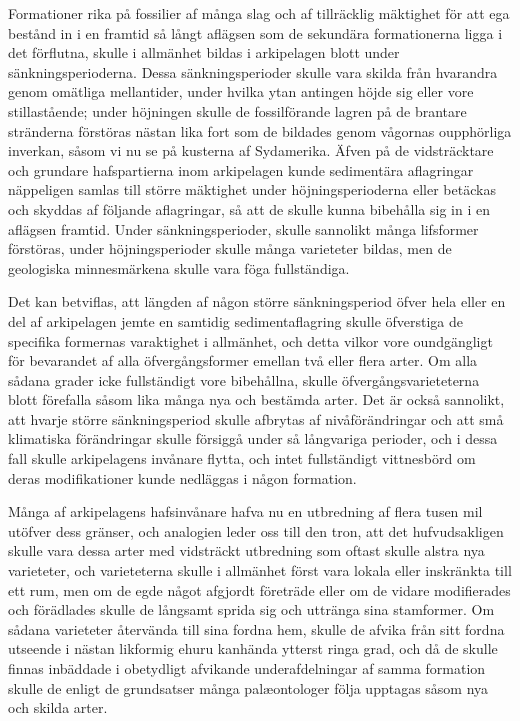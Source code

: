 Formationer rika på fossilier af många slag och af tillräcklig mäktighet för att ega bestånd in i en framtid så långt aflägsen som de sekundära formationerna ligga i det förflutna, skulle i allmänhet bildas i arkipelagen blott under sänkningsperioderna. Dessa sänkningsperioder skulle vara skilda från hvarandra genom omätliga mellantider, under hvilka ytan antingen höjde sig eller vore stillastående; under höjningen skulle de fossilförande lagren på de brantare stränderna förstöras nästan lika fort som de bildades genom vågornas oupphörliga inverkan, såsom vi nu se på kusterna af Sydamerika. Äfven på de vidsträcktare och grundare hafspartierna inom arkipelagen kunde sedimentära aflagringar näppeligen samlas till större mäktighet under höjningsperioderna eller betäckas och skyddas af följande aflagringar, så att de skulle kunna bibehålla sig in i en aflägsen framtid. Under sänkningsperioder, skulle sannolikt många lifsformer förstöras, under höjningsperioder skulle många varieteter bildas, men de geologiska minnesmärkena skulle vara föga fullständiga.

Det kan betviflas, att längden af någon större sänkningsperiod öfver hela eller en del af arkipelagen jemte en samtidig sedimentaflagring skulle öfverstiga de specifika formernas varaktighet i allmänhet, och detta vilkor vore oundgängligt för bevarandet af alla öfvergångsformer emellan två eller flera arter. Om alla sådana grader icke fullständigt vore bibehållna, skulle öfvergångsvarieteterna blott förefalla såsom lika många nya och bestämda arter. Det är också sannolikt, att hvarje större sänkningsperiod skulle afbrytas af nivåförändringar och att små klimatiska förändringar skulle försiggå under så långvariga perioder, och i dessa fall skulle arkipelagens invånare flytta, och intet fullständigt vittnesbörd om deras modifikationer kunde nedläggas i någon formation.

Många af arkipelagens hafsinvånare hafva nu en utbredning af flera tusen mil utöfver dess gränser, och analogien leder oss till den tron, att det hufvudsakligen skulle vara dessa arter med vidsträckt utbredning som oftast skulle alstra nya varieteter, och varieteterna skulle i allmänhet först vara lokala eller inskränkta till ett rum, men om de egde något afgjordt företräde eller om de vidare modifierades och förädlades skulle de långsamt sprida sig och uttränga sina stamformer. Om sådana varieteter återvända till sina fordna hem, skulle de afvika från sitt fordna utseende i nästan likformig ehuru kanhända ytterst ringa grad, och då de skulle finnas inbäddade i obetydligt afvikande underafdelningar af samma formation skulle de enligt de grundsatser många palæontologer följa upptagas såsom nya och skilda arter.

